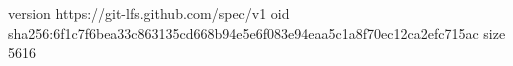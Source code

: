 version https://git-lfs.github.com/spec/v1
oid sha256:6f1c7f6bea33c863135cd668b94e5e6f083e94eaa5c1a8f70ec12ca2efc715ac
size 5616

